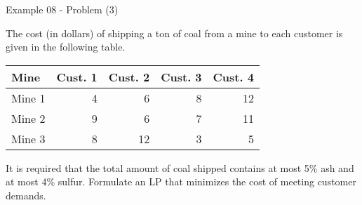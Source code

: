 \begin{frame}{Example 08 - Problem (3)}

The cost (in dollars) of shipping a ton of coal from a mine to each customer
is given in the following table.

\begin{center}
\begin{tabular}{lrrrr}
\hline
  \cellcolor{gray90}\textbf{Mine}
& \cellcolor{gray90}\textbf{Cust. 1}
& \cellcolor{gray90}\textbf{Cust. 2}
& \cellcolor{gray90}\textbf{Cust. 3}
& \cellcolor{gray90}\textbf{Cust. 4} \\
\hline
Mine 1 & 4 &  6 & 8 & 12 \\
Mine 2 & 9 &  6 & 7 & 11 \\
Mine 3 & 8 & 12 & 3 &  5 \\
\hline
\end{tabular}
\end{center}

It is required that the total amount of coal shipped contains at most 5\% ash
and at most 4\% sulfur. Formulate an LP that minimizes the cost of meeting
customer demands.

\end{frame}
